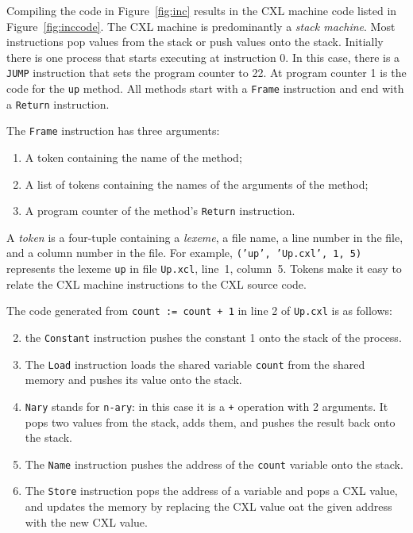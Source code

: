 \documentclass{report}
\begin{document}
Compiling the code in Figure~\ref{fig:inc} results in the CXL machine code
listed in Figure~\ref{fig:inccode}.
The CXL machine is predominantly a \emph{stack machine}.
Most instructions pop values from the stack or push values onto the stack.
Initially there is one process that starts executing at instruction 0.
In this case, there is a \texttt{JUMP} instruction that sets the program
counter to 22.  At program counter 1 is the code for the \texttt{up} method.
All methods start with a \texttt{Frame} instruction and end with a \texttt{Return}
instruction.

The \texttt{Frame} instruction has three arguments:
\begin{enumerate}
\item A token containing the name of the method;
\item A list of tokens containing the names of the arguments of the method;
\item A program counter of the method's \texttt{Return} instruction.
\end{enumerate}

A \emph{token} is a four-tuple containing a \emph{lexeme}, a file name, a
line number in the file, and a column number in the file.  For example,
\texttt{(’up’, ’Up.cxl’, 1, 5)} represents the lexeme \texttt{up} in
file \texttt{Up.xcl}, line~1, column~5.  Tokens make it easy to relate
the CXL machine instructions to the CXL source code.

The code generated from \texttt{count := count + 1} in line 2 of
\texttt{Up.cxl} is as follows:

\begin{enumerate} \setcounter{enumi}{1}
\item the \texttt{Constant} instruction pushes the constant 1
onto the stack of the process.
\item The \texttt{Load} instruction loads the shared variable
\texttt{count} from the shared memory and pushes its value onto the
stack.
\item \texttt{Nary} stands for \texttt{n-ary}: in this case it is a \texttt{+}
operation with 2 arguments.  It pops two values from the stack, adds them,
and pushes the result back onto the stack.
\item The \texttt{Name} instruction pushes the address of the \texttt{count}
variable onto the stack.
\item The \texttt{Store} instruction pops the address of a variable and pops
a CXL value, and updates the memory by replacing the CXL value oat the given
address with the new CXL value.
\end{enumerate}
\end{document}
